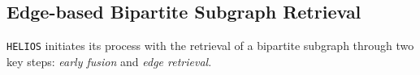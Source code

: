 



















\vspace{-1mm}
\subsection{Edge-based Bipartite Subgraph Retrieval}
\label{sec:candidate_bipartite_graph_generation}
\vspace{-1mm}


\texttt{HELIOS} initiates its process with the retrieval of a bipartite subgraph through two key steps: \textit{early fusion} and \textit{edge retrieval}.


